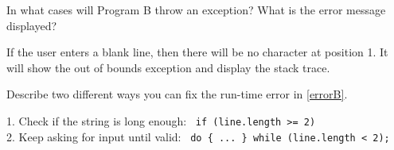%


\Q \label{errorB} In what cases will Program B throw an exception? What is the error message displayed?

\begin{answer}
If the user enters a blank line, then there will be no character at position 1. It will show the out of bounds exception and display the stack trace.
\end{answer}


\Q Describe two different ways you can fix the run-time error in \ref{errorB}.

\begin{answer}[3em]
1. Check if the string is long enough: ~{\tt if (line.length >= 2)} \\
2. Keep asking for input until valid: ~{\tt do \{~...~\} while (line.length < 2);}
\end{answer}
